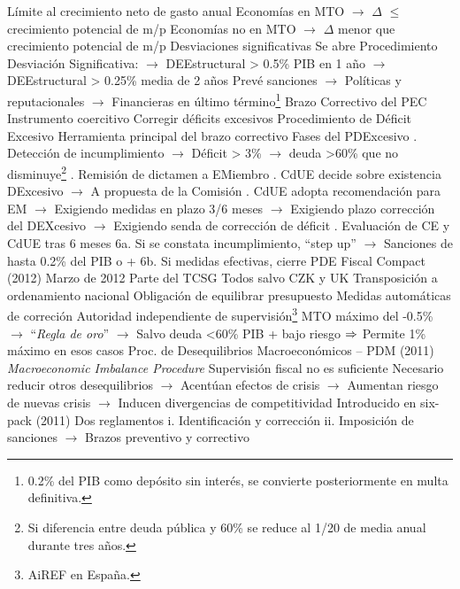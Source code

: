 \documentclass{nuevotema}
\begin{document}
\begin{esquemal}
				\4[] Límite al crecimiento neto de gasto anual
				\4[] Economías en MTO
				\4[] $\to$ $\Delta$ $\leq$ crecimiento potencial de m/p
				\4[] Economías no en MTO
				\4[] $\to$ $\Delta$ menor que crecimiento potencial de m/p
				\4 Desviaciones significativas
				\4[] Se abre Procedimiento Desviación Significativa:
				\4[] $\to$ DEEstructural > 0.5\% PIB en 1 año
				\4[] $\to$ DEEstructural > 0.25\% media de 2 años
				\4[] Prevé sanciones
				\4[] $\to$ Políticas y reputacionales
				\4[] $\to$ Financieras en último término\footnote{0.2\% del PIB como depósito sin interés, se convierte posteriormente en multa definitiva.}
			\3 Brazo Correctivo del PEC
				\4 Instrumento coercitivo
				\4[] Corregir déficits excesivos
				\4 Procedimiento de Déficit Excesivo
				\4[] Herramienta principal del brazo correctivo
				\4 Fases del PDExcesivo
				. Detección de incumplimiento
				\4[] $\to$ Déficit > 3\%
				\4[] $\to$ deuda >60\% que no disminuye\footnote{Si diferencia entre deuda pública y 60\% se reduce al 1/20 de media anual durante tres años.}
				. Remisión de dictamen a EMiembro
				. CdUE decide sobre existencia DExcesivo
				\4[] $\to$ A propuesta de la Comisión
				. CdUE adopta recomendación para EM
				\4[] $\to$ Exigiendo medidas en plazo 3/6 meses
				\4[] $\to$ Exigiendo plazo corrección del DEXcesivo
				\4[] $\to$ Exigiendo senda de corrección de déficit
				. Evaluación de CE y CdUE tras 6 meses
				\4[] 6a. Si se constata incumplimiento, ``step up''
				\4[] $\to$ Sanciones de hasta 0.2\% del PIB o +
				\4[] 6b. Si medidas efectivas, cierre PDE
			\3 Fiscal Compact (2012)
				\4 Marzo de 2012
				\4 Parte del TCSG
				\4 Todos salvo CZK y UK
				\4 Transposición a ordenamiento nacional
				\4[] Obligación de equilibrar presupuesto
				\4[] Medidas automáticas de correción
				\4[] Autoridad independiente de supervisión\footnote{AiREF en España.}
				\4[] MTO máximo del -0.5\%
				\4[] $\to$ ``\textit{Regla de oro}''
				\4[] $\to$ Salvo deuda <60\% PIB + bajo riesgo
				\4[] $\Rightarrow$ Permite 1\% máximo en esos casos
			\3 Proc. de Desequilibrios Macroeconómicos -- PDM (2011)
				\4 \textit{Macroeconomic Imbalance Procedure}
				\4 Supervisión fiscal no es suficiente
				\4[] Necesario reducir otros desequilibrios
				\4[] $\to$ Acentúan efectos de crisis
				\4[] $\to$ Aumentan riesgo de nuevas crisis
				\4[] $\to$ Inducen divergencias de competitividad
				\4 Introducido en six-pack (2011)
				\4[] Dos reglamentos
				\4[] i. Identificación y corrección
				\4[] ii. Imposición de sanciones
				\4[] $\to$ Brazos preventivo y correctivo

\end{esquemal}
\end{document}
